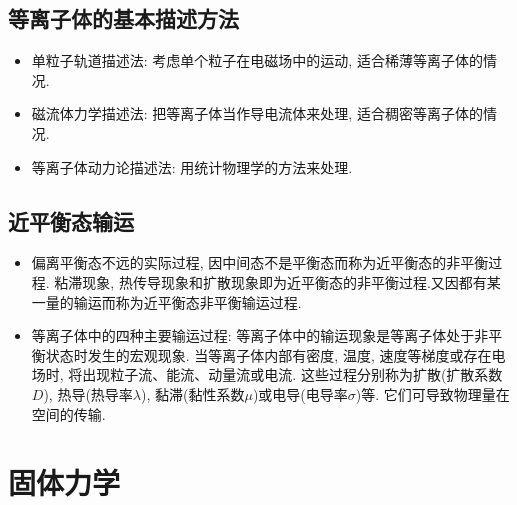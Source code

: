 \documentclass[a4paper,titlepage,twocolumn]{article}
\begin{document}
\subsection{等离子体的基本描述方法}
\begin{itemize}
\item 单粒子轨道描述法: 考虑单个粒子在电磁场中的运动, 适合稀薄等离子体的情况.
\item 磁流体力学描述法: 把等离子体当作导电流体来处理, 适合稠密等离子体的情况.
\item 等离子体动力论描述法: 用统计物理学的方法来处理.
\end{itemize}

\subsection{近平衡态输运}
\begin{itemize}
\item 偏离平衡态不远的实际过程, 因中间态不是平衡态而称为近平衡态的非平衡过程.
粘滞现象, 热传导现象和扩散现象即为近平衡态的非平衡过程.又因都有某一量的输运而称为近平衡态非平衡输运过程.

\item 等离子体中的四种主要输运过程: 等离子体中的输运现象是等离子体处于非平衡状态时发生的宏观现象.
当等离子体内部有密度, 温度, 速度等梯度或存在电场时, 将出现粒子流、能流、动量流或电流. 这些过程分别称为扩散(扩散系数$D$), 热导(热导率$\lambda$), 黏滞(黏性系数$\mu$)或电导(电导率$\sigma$)等. 它们可导致物理量在空间的传输.
\end{itemize}

\section{固体力学}
\end{document}
